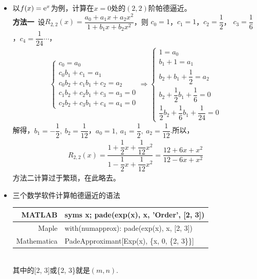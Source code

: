 \begin{itemize}[leftmargin=\inteval{\myitemleftmargin}pt,itemsep=
   \inteval{\myitemitempsep}pt,topsep=\inteval{\myitemtopsep}pt]
\item 以$ f(x)=\mathrm{e}^x $为例，计算在$ x=0 $处的$ (2,2) $阶帕德逼近。\\
\textbf{方法一}\ 设$ R_{2,2}(x)=\dfrac{a_0+a_1x+a_2x^2}{1+b_1x+b_2x^2} $，则
$ c_0=1 $，$ c_1=1 $，$ c_2=\dfrac{1}{2} $，
$ c_3=\dfrac{1}{6} $，$ c_4=\dfrac{1}{24}\cdots $，
\begin{gather*}
    \begin{cases}
        c_0=a_0 \\
        c_0b_1+c_1=a_1 \\
        c_0b_2+c_1b_1+c_2=a_2 \\
        c_1b_2+c_2b_1+c_3=a_3=0 \\
        c_2b_2+c_3b_1+c_4=a_4=0
    \end{cases} \Rightarrow 
    \begin{cases}
        1=a_0 \\
        b_1+1=a_1 \\
        b_2+b_1+\dfrac{1}{2}=a_2 \\
        b_2+\dfrac{1}{2}b_1+\dfrac{1}{6}=0 \\
        \dfrac{1}{2}b_2+\dfrac{1}{6}b_1+\dfrac{1}{24}=0
    \end{cases}
\end{gather*}
解得，$ b_1=-\dfrac{1}{2},\ b_2=\dfrac{1}{12} $，$ a_0=1,\ 
a_1=\dfrac{1}{2},\ a_2=\dfrac{1}{12} $.所以，
\begin{gather*}
    R_{2,2}(x)=\dfrac{1+\dfrac{1}{2}x+\dfrac{1}{12}x^2}{1
        -\dfrac{1}{2}x+\dfrac{1}{12}x^2}=
    \dfrac{12+6x+x^2}{12-6x+x^2}
\end{gather*}
方法二计算过于繁琐，在此略去。

\item 三个数学软件计算帕德逼近的语法 
\begin{table}[!htbp]
\centering
\begin{tabular}{|r|l|}
    \hline
    MATLAB & syms x; pade(exp(x), x, 'Order', [2, 3]) \\ \hline
    Maple & with(numapprox): pade(exp(x), x, [2, 3]) \\ \hline
    Mathematica & PadeApproximant[Exp(x), \{x, 0, \{2, 3\}\}] \\ \hline
\end{tabular}
\end{table} \\
其中的[2, 3]或\{2, 3\}就是$ (m,n) $.


\end{itemize}
